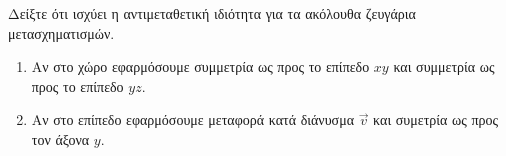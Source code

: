 \begin{exercise}
	Δείξτε ότι ισχύει η αντιμεταθετική ιδιότητα για τα ακόλουθα ζευγάρια μετασχηματισμών.
	\begin{enumerate}
		\item Αν στο χώρο εφαρμόσουμε συμμετρία ως προς το επίπεδο $xy$ και συμμετρία ως προς το επίπεδο $yz$.
		\item Αν στο επίπεδο εφαρμόσουμε μεταφορά κατά διάνυσμα $\vec{v}$ και συμετρία ως προς τον άξονα $y$.
	\end{enumerate}
\end{exercise}


%	
%	
%	
%	
%	
